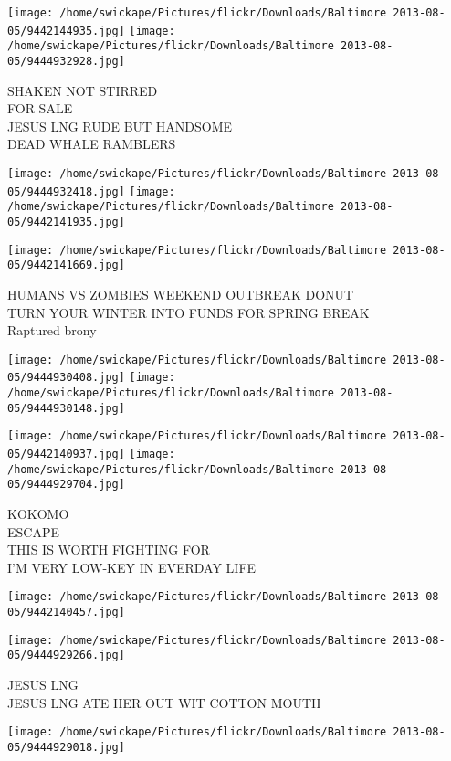 \documentclass[10pt,letterpaper]{article}
\begin{document}
\texttt{[image: /home/swickape/Pictures/flickr/Downloads/Baltimore 2013-08-05/9442144935.jpg]}
\texttt{[image: /home/swickape/Pictures/flickr/Downloads/Baltimore 2013-08-05/9444932928.jpg]}

SHAKEN NOT STIRRED\\
FOR SALE\\
JESUS LNG RUDE BUT HANDSOME\\
DEAD WHALE RAMBLERS
\pagebreak

\texttt{[image: /home/swickape/Pictures/flickr/Downloads/Baltimore 2013-08-05/9444932418.jpg]}
\texttt{[image: /home/swickape/Pictures/flickr/Downloads/Baltimore 2013-08-05/9442141935.jpg]}

\vspace{0.25in}
\texttt{[image: /home/swickape/Pictures/flickr/Downloads/Baltimore 2013-08-05/9442141669.jpg]}

HUMANS VS ZOMBIES WEEKEND OUTBREAK DONUT\\
TURN YOUR WINTER INTO FUNDS FOR SPRING BREAK\\
Raptured brony
\pagebreak

\texttt{[image: /home/swickape/Pictures/flickr/Downloads/Baltimore 2013-08-05/9444930408.jpg]}
\texttt{[image: /home/swickape/Pictures/flickr/Downloads/Baltimore 2013-08-05/9444930148.jpg]}

\texttt{[image: /home/swickape/Pictures/flickr/Downloads/Baltimore 2013-08-05/9442140937.jpg]}
\texttt{[image: /home/swickape/Pictures/flickr/Downloads/Baltimore 2013-08-05/9444929704.jpg]}

KOKOMO\\
ESCAPE\\
THIS IS WORTH FIGHTING FOR\\
I'M VERY LOW{-}KEY IN EVERDAY LIFE
\pagebreak

\texttt{[image: /home/swickape/Pictures/flickr/Downloads/Baltimore 2013-08-05/9442140457.jpg]}

\vspace{0.25in}
\texttt{[image: /home/swickape/Pictures/flickr/Downloads/Baltimore 2013-08-05/9444929266.jpg]}

JESUS LNG\\
JESUS LNG ATE HER OUT WIT COTTON MOUTH
\pagebreak

\texttt{[image: /home/swickape/Pictures/flickr/Downloads/Baltimore 2013-08-05/9444929018.jpg]}
\end{document}

